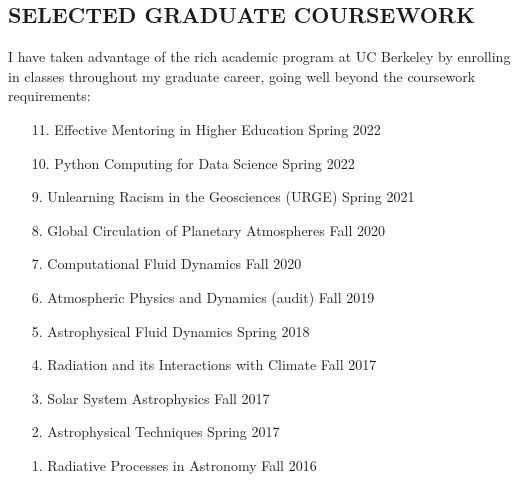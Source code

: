 \documentclass[margin, 10pt]{res} %
\begin{document}
\begin{resume}



\section{SELECTED GRADUATE COURSEWORK}

I have taken advantage of the rich academic program at UC Berkeley by enrolling in classes throughout my graduate career, going well beyond the coursework requirements:

\begin{enumerate}
	
	\item[11.] Effective Mentoring in Higher Education \hfill Spring 2022
	
	\item[10.] Python Computing for Data Science \hfill Spring 2022
	
	\item[9.] Unlearning Racism in the Geosciences (URGE) \hfill Spring 2021
	
	\item[8.] Global Circulation of Planetary Atmospheres \hfill Fall 2020
	
	\item[7.] Computational Fluid Dynamics \hfill Fall 2020
	
	\item[6.] Atmospheric Physics and Dynamics (audit) \hfill Fall 2019
	
	\item[5.] Astrophysical Fluid Dynamics \hfill Spring 2018
	
	\item[4.] Radiation and its Interactions with Climate \hfill Fall 2017
	
	\item[3.] Solar System Astrophysics \hfill Fall 2017
	
	\item[2.] Astrophysical Techniques \hfill Spring 2017
	
	\item[1.] Radiative Processes in Astronomy \hfill Fall 2016
	

\end{enumerate}
\end{resume}
\end{document}
